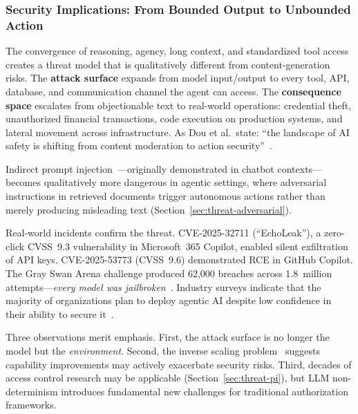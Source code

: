 \subsubsection{Security Implications: From Bounded Output to Unbounded Action}
\label{sec:cap-implications}

The convergence of reasoning, agency, long context, and standardized tool access creates a threat model that is qualitatively different from content-generation risks. The \textbf{attack surface} expands from model input/output to every tool, API, database, and communication channel the agent can access. The \textbf{consequence space} escalates from objectionable text to real-world operations: credential theft, unauthorized financial transactions, code execution on production systems, and lateral movement across infrastructure. As Dou et al.\ state: ``the landscape of AI safety is shifting from content moderation to action security''~\cite{dou2026ajar}.

Indirect prompt injection~\cite{greshake2023ipi}---originally demonstrated in chatbot contexts---becomes qualitatively more dangerous in agentic settings, where adversarial instructions in retrieved documents trigger autonomous actions rather than merely producing misleading text (Section~\ref{sec:threat-adversarial}).

Real-world incidents confirm the threat. CVE-2025-32711 (``EchoLeak''), a zero-click CVSS~9.3 vulnerability in Microsoft~365 Copilot, enabled silent exfiltration of API keys. CVE-2025-53773 (CVSS~9.6) demonstrated RCE in GitHub Copilot. The Gray Swan Arena challenge produced 62,000 breaches across 1.8~million attempts---\emph{every model was jailbroken}~\cite{grayswan2025arena}. Industry surveys indicate that the majority of organizations plan to deploy agentic AI despite low confidence in their ability to secure it~\cite{cisco2026aisecurity}.

Three observations merit emphasis. First, the attack surface is no longer the model but the \emph{environment}. Second, the inverse scaling problem~\cite{wang2025mcptox} suggests capability improvements may actively exacerbate security risks. Third, decades of access control research may be applicable (Section~\ref{sec:threat-pi}), but LLM non-determinism introduces fundamental new challenges for traditional authorization frameworks.

